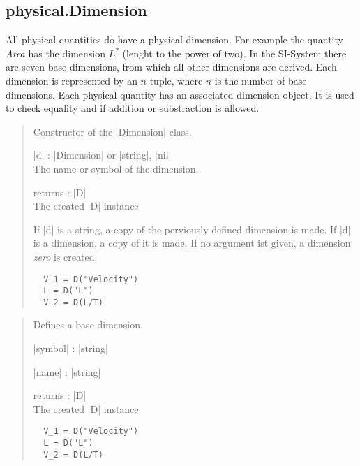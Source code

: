 \documentclass{ltxdoc}
\renewcommand{\emph}[1]{\textit{#1}}
\begin{document}
\newpage
\subsection{physical.Dimension}

 All physical quantities do have a physical dimension. For example the quantity \emph{Area} has the dimension $L^2$ (lenght to the power of two). In the SI-System there are seven base dimensions, from which all other dimensions are derived. Each dimension is represented by an $n$-tuple, where $n$ is the number of base dimensions. Each physical quantity has an associated dimension object. It is used to check equality and if addition or substraction is allowed.


\begin{quote}
  Constructor of the |Dimension| class.

  \begin{description}
  \item |d| : |Dimension| or |string|, |nil|\\
    The name or symbol of the dimension.

  \item returns : |D|\\
    The created |D| instance
  \end{description}

  If |d| is a string, a copy of the perviously defined dimension is made. If |d| is a dimension, a copy of it is made. If no argument ist given, a dimension \emph{zero} is created.


  \subtitle{Example}
  \begin{lstlisting}
  V_1 = D("Velocity")
  L = D("L")
  V_2 = D(L/T)
  \end{lstlisting}
\end{quote}


\begin{quote}
  Defines a base dimension.

  \begin{description}
  \item |symbol| : |string|\\

  \item |name| : |string|\\

  \item returns : |D|\\
    The created |D| instance
  \end{description}


  \subtitle{Example}
  \begin{lstlisting}
  V_1 = D("Velocity")
  L = D("L")
  V_2 = D(L/T)
  \end{lstlisting}
\end{quote}
\end{document}
